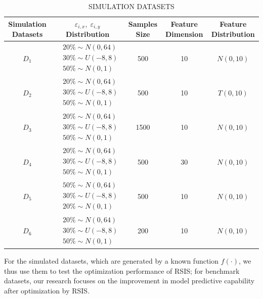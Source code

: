 \documentclass[lettersize,journal]{IEEEtran}
\begin{document}
\begin{table}[!t]
  \caption{SIMULATION DATASETS\label{tab2}}
  \centering
  \begin{tabular}{ccccc}
  \toprule
  Simulation Datasets & $\varepsilon_{i,x},\;\varepsilon_{i,y}$ Distribution & Samples Size & Feature Dimension & Feature Distribution \\
  \midrule
  $D_1$ & $\begin{aligned}&20\%\sim N(0,64)\\&30\%\sim U(-8,8)\\&50\%\sim N(0,1)\end{aligned}$ & 500 & 10 & $N(0,10)$ \\
  \midrule
  $D_2$ & $\begin{aligned}&20\%\sim N(0,64)\\&30\%\sim U(-8,8)\\&50\%\sim N(0,1)\end{aligned}$ & 500 & 10 & $T(0,10)$ \\
  \midrule
  $D_3$ & $\begin{aligned}&20\%\sim N(0,64)\\&30\%\sim U(-8,8)\\&50\%\sim N(0,1)\end{aligned}$ & 1500 & 10 & $N(0,10)$ \\
  \midrule
  $D_4$ & $\begin{aligned}&20\%\sim N(0,64)\\&30\%\sim U(-8,8)\\&50\%\sim N(0,1)\end{aligned}$ & 500 & 30 & $N(0,10)$ \\
  \midrule
  $D_5$ & $\begin{aligned}&50\%\sim N(0,64)\\&30\%\sim U(-8,8)\\&20\%\sim N(0,1)\end{aligned}$ & 500 & 10 & $N(0,10)$ \\
  \midrule
  $D_6$ & $\begin{aligned}&20\%\sim N(0,64)\\&30\%\sim U(-8,8)\\&50\%\sim N(0,1)\end{aligned}$ & 200 & 10 & $N(0,10)$ \\
  \bottomrule
  \end{tabular}
\end{table}

For the simulated datasets, which are generated by a known 
function $f(\cdot)$, we thus use them to test the optimization 
performance of RSIS; for benchmark datasets, our research focuses 
on the improvement in model predictive capability after 
optimization by RSIS.
\end{document}
